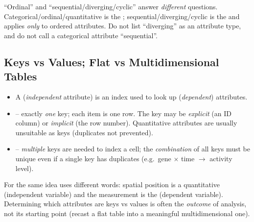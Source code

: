 \begin{center}
\end{center}

\begin{pitfall}
``Ordinal'' and ``sequential/diverging/cyclic'' answer \emph{different} questions.
Categorical/ordinal/quantitative is the ; sequential/diverging/cyclic is the  and applies \emph{only} to ordered attributes. Do not list ``diverging'' as an attribute type, and do not call a categorical attribute ``sequential''.
\end{pitfall}

\subsection{Keys vs Values; Flat vs Multidimensional Tables}

\begin{itemize}
  \item A  (\emph{independent} attribute) is an index used to look up  (\emph{dependent}) attributes.
  \item {} -- exactly \emph{one} key; each item is one row. The key may be \emph{explicit} (an ID column) or \emph{implicit} (the row number). Quantitative attributes are usually unsuitable as keys (duplicates not prevented).
  \item {} -- \emph{multiple} keys are needed to index a cell; the \emph{combination} of all keys must be unique even if a single key has duplicates (e.g.\ gene $\times$ time $\rightarrow$ activity level).
\end{itemize}
For  the same idea uses different words: spatial position is a
quantitative  (independent variable) and the measurement is the
 (dependent variable). Determining which attributes are keys vs
values is often the \emph{outcome} of analysis, not its starting point (recast a
flat table into a meaningful multidimensional one).

